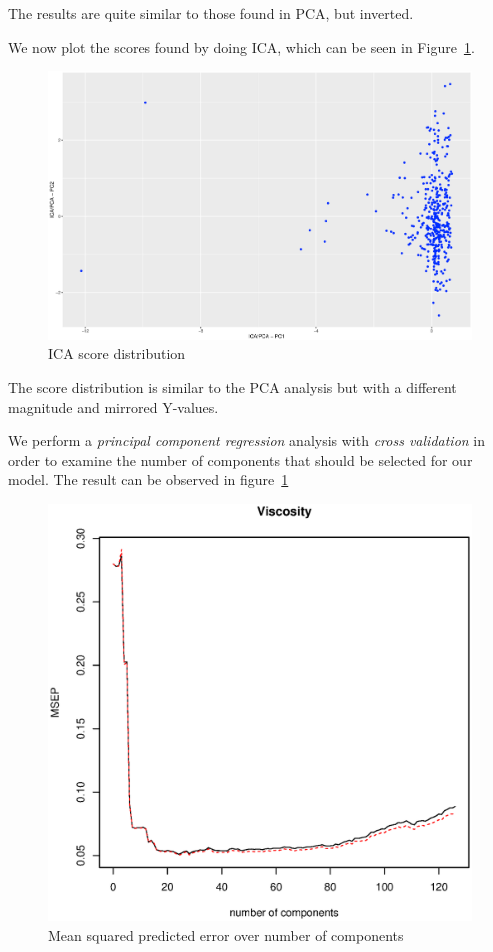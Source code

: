 \documentclass[a4paper,12pt]{article}
\begin{document}
    The results are quite similar to those found in PCA, but inverted.

    We now plot the scores found by doing ICA, which can be seen in Figure~\ref{fig:icascores}.
    \begin{figure}[H]          
    \centering
    \caption{ICA score distribution}
    \label{fig:icascores}
    \includegraphics[width=\textwidth]{figures/A2_icascore.eps}
    \end{figure}

    The score distribution is similar to the PCA analysis but with a different magnitude and mirrored Y-values.

    We perform a \emph{principal component regression} analysis with \emph{cross validation} in order to examine the number of components that should be selected for our model. The result can be observed in figure~\ref{fig:icascores}

    \begin{figure}[H]            
    \centering
    \caption{Mean squared predicted error over number of components}
    \label{fig:viscosity}
    \includegraphics[width=\textwidth]{figures/A2_viscosity.eps}
    \end{figure}
\end{document}
